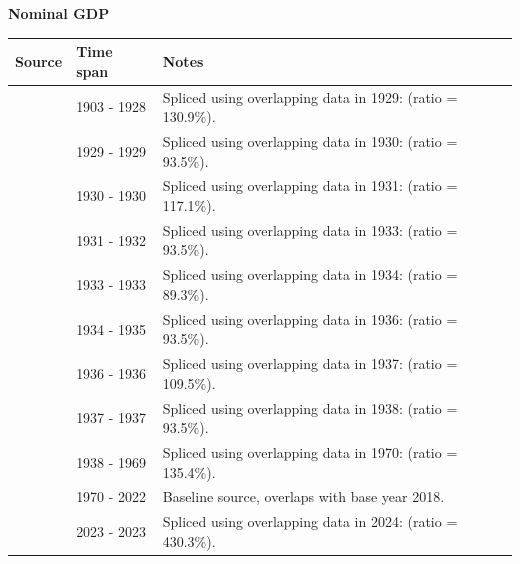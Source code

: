 \documentclass[12pt,a4paper,landscape]{article}
\begin{document}
\begin{adjustbox}{max totalsize={\paperwidth}{\paperheight},center}
\begin{minipage}[t][\textheight][t]{\textwidth}
\vspace*{0.5cm}
{}
\begin{center}
{\Large\bfseries Nominal GDP}
\end{center}
\vspace{0.5cm}
\begin{table}[H]
\centering
\small
\begin{tabular}{|l|l|l|}
\hline
\textbf{Source} & \textbf{Time span} & \textbf{Notes} \\
\hline
\rowcolor{white}\cite{Mitchell}& 1903 - 1928 &Spliced using overlapping data in 1929: (ratio = 130.9\%). \\
\rowcolor{lightgray}\cite{MOXLAD}& 1929 - 1929 &Spliced using overlapping data in 1930: (ratio = 93.5\%). \\
\rowcolor{white}\cite{Mitchell}& 1930 - 1930 &Spliced using overlapping data in 1931: (ratio = 117.1\%). \\
\rowcolor{lightgray}\cite{MOXLAD}& 1931 - 1932 &Spliced using overlapping data in 1933: (ratio = 93.5\%). \\
\rowcolor{white}\cite{Mitchell}& 1933 - 1933 &Spliced using overlapping data in 1934: (ratio = 89.3\%). \\
\rowcolor{lightgray}\cite{MOXLAD}& 1934 - 1935 &Spliced using overlapping data in 1936: (ratio = 93.5\%). \\
\rowcolor{white}\cite{Mitchell}& 1936 - 1936 &Spliced using overlapping data in 1937: (ratio = 109.5\%). \\
\rowcolor{lightgray}\cite{MOXLAD}& 1937 - 1937 &Spliced using overlapping data in 1938: (ratio = 93.5\%). \\
\rowcolor{white}\cite{Mitchell}& 1938 - 1969 &Spliced using overlapping data in 1970: (ratio = 135.4\%). \\
\rowcolor{lightgray}\cite{WDI}& 1970 - 2022 &Baseline source, overlaps with base year 2018. \\
\rowcolor{white}\cite{FAO}& 2023 - 2023 &Spliced using overlapping data in 2024: (ratio = 430.3\%). \\
\hline
\end{tabular}
\end{table}
\begin{figure}[H]
\centering

\end{figure}
\end{minipage}
\end{adjustbox}
\end{document}
